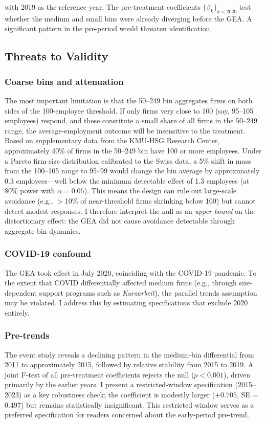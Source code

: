 \documentclass[12pt]{article}
\begin{document}
\noindent with 2019 as the reference year. The pre-treatment coefficients $\{\beta_k\}_{k < 2020}$ test whether the medium and small bins were already diverging before the GEA. A significant pattern in the pre-period would threaten identification.

\subsection{Threats to Validity}

\subsubsection*{Coarse bins and attenuation} The most important limitation is that the 50--249 bin aggregates firms on both sides of the 100-employee threshold. If only firms very close to 100 (say, 95--105 employees) respond, and these constitute a small share of all firms in the 50--249 range, the average-employment outcome will be insensitive to the treatment. Based on supplementary data from the KMU-HSG Research Center, approximately 40\% of firms in the 50--249 bin have 100 or more employees. Under a Pareto firm-size distribution calibrated to the Swiss data, a 5\% shift in mass from the 100--105 range to 95--99 would change the bin average by approximately 0.3 employees---well below the minimum detectable effect of 1.3 employees (at 80\% power with $\alpha = 0.05$). This means the design can rule out large-scale avoidance (e.g., $>$10\% of near-threshold firms shrinking below 100) but cannot detect modest responses. I therefore interpret the null as an \emph{upper bound} on the distortionary effect: the GEA did not cause avoidance detectable through aggregate bin dynamics.

\subsubsection*{COVID-19 confound} The GEA took effect in July 2020, coinciding with the COVID-19 pandemic. To the extent that COVID differentially affected medium firms (e.g., through size-dependent support programs such as \emph{Kurzarbeit}), the parallel trends assumption may be violated. I address this by estimating specifications that exclude 2020 entirely.

\subsubsection*{Pre-trends} The event study reveals a declining pattern in the medium-bin differential from 2011 to approximately 2015, followed by relative stability from 2015 to 2019. A joint F-test of all pre-treatment coefficients rejects the null ($p < 0.001$), driven primarily by the earlier years. I present a restricted-window specification (2015--2023) as a key robustness check; the coefficient is modestly larger ($+0.705$, SE = 0.497) but remains statistically insignificant. This restricted window serves as a preferred specification for readers concerned about the early-period pre-trend.
\end{document}
